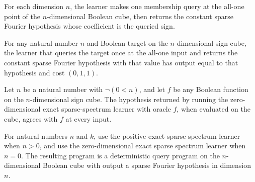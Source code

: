 \begin{definition}
\label{FABL.zeroDimensionExactSparseSpectrumLearner}
\leanok
{}
For each dimension $n$, the learner makes one membership query at the all-one point of
the $n$-dimensional Boolean cube, then returns the constant sparse Fourier hypothesis
whose coefficient is the queried sign.
\end{definition}

\begin{theorem}
\label{FABL.runWithCost_zeroDimensionExactSparseSpectrumLearner}
\leanok
{}
For any natural number $n$ and Boolean target on the $n$-dimensional sign cube, the
learner that queries the target once at the all-one input and returns the constant
sparse Fourier hypothesis with that value has output equal to that hypothesis and cost
$(0,1,1)$.
\end{theorem}

\begin{theorem}
\label{FABL.zeroDimensionExactSparseSpectrumLearner_evaluate_eq}
\leanok
{}
Let $n$ be a natural number with $\neg(0<n)$, and let $f$ be any Boolean function on the
$n$-dimensional sign cube. The hypothesis returned by running the zero-dimensional exact
sparse-spectrum learner with oracle $f$, when evaluated on the cube, agrees with $f$ at
every input.
\end{theorem}

\begin{definition}
\label{FABL.exactSparseSpectrumLearner}
\leanok
{}
For natural numbers $n$ and $k$, use the positive exact sparse spectrum learner when
$n>0$, and use the zero-dimensional exact sparse spectrum learner when $n=0$. The
resulting program is a deterministic query program on the $n$-dimensional Boolean cube
with output a sparse Fourier hypothesis in dimension $n$.
\end{definition}

